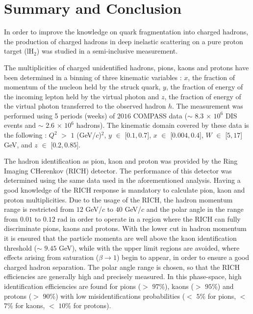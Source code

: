 
\chapter{Summary and Conclusion} %

\label{ch:CCL} %


In order to improve the knowledge on quark fragmentation into charged hadrons, the production of charged hadrons in deep inelastic scattering on a pure proton target (lH$_2$) was studied in a semi-inclusive measurement.

The multiplicities of charged unidentified hadrons, pions, kaons and protons have been determined in a binning of three kinematic variables : $x$, the fraction of momentum of the nucleon held by the struck quark, $y$, the fraction of energy of the incoming lepton held by the virtual photon and $z$, the fraction of energy of the virtual photon transferred to the observed hadron $h$. The measurement was performed using 5 periods (weeks) of $2016$ COMPASS data ($\sim$ $8.3$ $\times$ $10^6$ DIS events and $\sim$ $2.6$ $\times$ $10^6$ hadrons). The kinematic domain covered by these data is the following : $Q^2$ $>$ $1$ (GeV/$c$)$^2$, $y$ $\in$ [$0.1,0.7$], $x$ $\in$ [$0.004,0.4$], $W$ $\in$ [$5,17$] GeV, and $z$ $\in$ [$0.2,0.85$].

The hadron identification as pion, kaon and proton was provided by the Ring Imaging CHerenkov (RICH) detector. The performance of this detector was determined using the same data used in the aforementioned analysis. Having a good knowledge of the RICH response is mandatory to calculate pion, kaon and proton multiplicities. Due to the usage of the RICH, the hadron momentum range is restricted from $12$ GeV/$c$ to $40$ GeV/$c$ and the polar angle in the range from $0.01$ to $0.12$ rad in order to operate in a region where the RICH can fully discriminate pions, kaons and protons. With the lower cut in hadron momentum it is ensured that the particle momenta are well above the kaon identification threshold ($\sim$ $9.45$ GeV), while with the upper limit regions are avoided, where effects arising from saturation ($\beta \rightarrow 1$) begin to appear, in order to ensure a good charged hadron separation. The polar angle range is chosen, so that the RICH efficiencies are generally high and precisely measured. In this phase-space, high identification efficiencies are found for pions ($>$ $97$\%), kaons ($>$ $95$\%) and protons ($>$ $90$\%) with low misidentifications probabilities ($<$ $5$\% for pions, $<$ $7$\% for kaons, $<$ $10$\% for protons).

